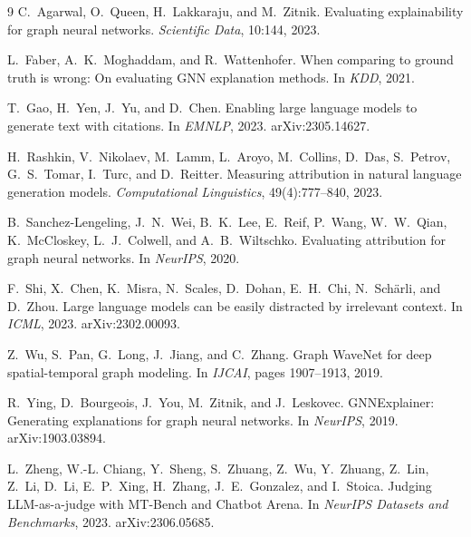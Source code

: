 \documentclass{article}
\begin{document}
\begin{thebibliography}{9}
C.~Agarwal, O.~Queen, H.~Lakkaraju, and M.~Zitnik.
\newblock Evaluating explainability for graph neural networks.
\newblock \emph{Scientific Data}, 10:144, 2023.

L.~Faber, A.~K.~Moghaddam, and R.~Wattenhofer.
\newblock When comparing to ground truth is wrong: On evaluating GNN explanation
methods.
\newblock In \emph{KDD}, 2021.

T.~Gao, H.~Yen, J.~Yu, and D.~Chen.
\newblock Enabling large language models to generate text with citations.
\newblock In \emph{EMNLP}, 2023. arXiv:2305.14627.

H.~Rashkin, V.~Nikolaev, M.~Lamm, L.~Aroyo, M.~Collins, D.~Das, S.~Petrov,
G.~S.~Tomar, I.~Turc, and D.~Reitter.
\newblock Measuring attribution in natural language generation models.
\newblock \emph{Computational Linguistics}, 49(4):777--840, 2023.

B.~Sanchez-Lengeling, J.~N.~Wei, B.~K.~Lee, E.~Reif, P.~Wang, W.~W.~Qian,
K.~McCloskey, L.~J.~Colwell, and A.~B.~Wiltschko.
\newblock Evaluating attribution for graph neural networks.
\newblock In \emph{NeurIPS}, 2020.

F.~Shi, X.~Chen, K.~Misra, N.~Scales, D.~Dohan, E.~H.~Chi, N.~Sch\"arli, and
D.~Zhou.
\newblock Large language models can be easily distracted by irrelevant context.
\newblock In \emph{ICML}, 2023. arXiv:2302.00093.

Z.~Wu, S.~Pan, G.~Long, J.~Jiang, and C.~Zhang.
\newblock Graph WaveNet for deep spatial-temporal graph modeling.
\newblock In \emph{IJCAI}, pages 1907--1913, 2019.

R.~Ying, D.~Bourgeois, J.~You, M.~Zitnik, and J.~Leskovec.
\newblock GNNExplainer: Generating explanations for graph neural networks.
\newblock In \emph{NeurIPS}, 2019. arXiv:1903.03894.

L.~Zheng, W.-L. Chiang, Y.~Sheng, S.~Zhuang, Z.~Wu, Y.~Zhuang, Z.~Lin, Z.~Li,
D.~Li, E.~P.~Xing, H.~Zhang, J.~E.~Gonzalez, and I.~Stoica.
\newblock Judging LLM-as-a-judge with MT-Bench and Chatbot Arena.
\newblock In \emph{NeurIPS Datasets and Benchmarks}, 2023. arXiv:2306.05685.
\end{thebibliography}
\end{document}
